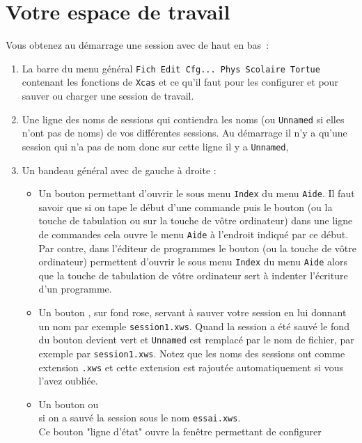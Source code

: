 \documentclass[a4paper,11pt]{article}
\begin{document}
\section{Votre espace de travail}
Vous obtenez au d\'emarrage une session avec de haut en bas~:
\begin{enumerate}
\item La barre du menu g\'en\'eral {\tt Fich Edit Cfg... Phys Scolaire Tortue} 
contenant les fonctions de {\tt Xcas} et ce qu'il faut pour les configurer et 
pour sauver ou charger une session de travail.
\item Une ligne des noms de sessions qui contiendra les noms (ou {\tt Unnamed} 
si elles n'ont pas de noms) de vos diff\'erentes sessions. Au d\'emarrage il 
n'y a qu'une session qui n'a pas de nom donc sur cette ligne il y a 
{\tt Unnamed},
\item Un bandeau g\'en\'eral avec de gauche \`a droite :
\begin{itemize}
\item Un bouton  permettant d'ouvrir le sous menu {\tt Index} 
du menu {\tt Aide}. Il faut savoir que si on tape
le d\'ebut d'une commande puis le bouton  (ou la touche de 
tabulation ou sur la touche  de v\^otre ordinateur)
dans une ligne de commandes cela ouvre le menu {\tt Aide} \`a l'endroit 
indiqu\'e par ce d\'ebut. Par contre, dans l'\'editeur de programmes le bouton 
 (ou  la touche  de v\^otre ordinateur) permettent
d'ouvrir le sous menu {\tt Index} du menu {\tt Aide} alors que la touche de 
tabulation de v\^otre ordinateur sert  \`a indenter l'\'ecriture d'un programme.
\item Un bouton , sur fond rose, servant \`a sauver votre 
session en lui donnant un nom par exemple {\tt session1.xws}. Quand la session 
a \'et\'e sauv\'e le fond du bouton  devient vert et
{\tt Unnamed} est remplac\'e par le nom de fichier, par exemple par
{\tt session1.xws}. Notez que
les noms des sessions ont comme extension {\tt .xws} et cette extension est 
rajout\'ee automatiquement si vous l'avez oubli\'ee.
\item Un bouton  ou\\
  si on a sauv\'e la 
session sous le nom  {\tt essai.xws}.\\
Ce  bouton "ligne d'\'etat" ouvre la fen\^etre permettant de configurer 

\end{itemize}
\end{enumerate}
\end{document}
